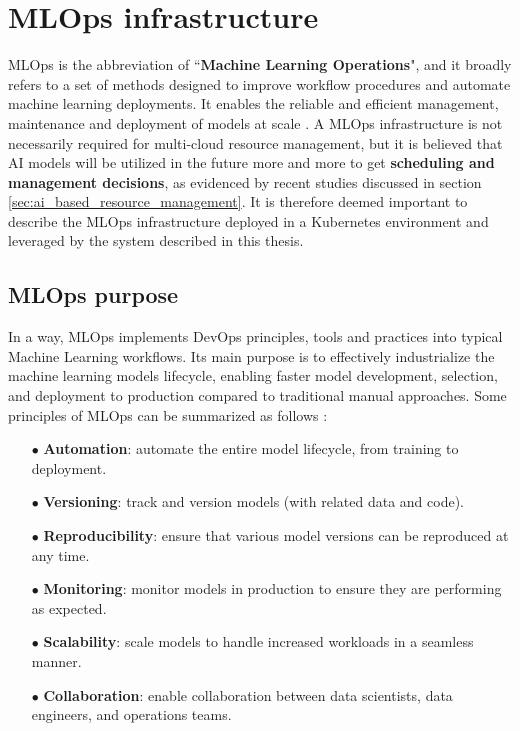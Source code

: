 \section{MLOps infrastructure}
\label{sec:mlops_infrastructure}

MLOps is the abbreviation of ``\textbf{Machine Learning Operations}", and it broadly refers to a set of methods designed to improve workflow procedures and automate machine learning deployments. 
It enables the reliable and efficient management, maintenance and deployment of models at scale \cite{mlops_ubuntu}.
A MLOps infrastructure is not necessarily required for multi-cloud resource management, but it is believed that AI models will be utilized in the future more and more to get \textbf{scheduling and management decisions}, as evidenced by recent studies discussed in section \ref{sec:ai_based_resource_management}.
It is therefore deemed important to describe the MLOps infrastructure deployed in a Kubernetes environment and leveraged by the system described in this thesis.

\subsection{MLOps purpose}

In a way, MLOps implements DevOps principles, tools and practices into typical Machine Learning workflows.
Its main purpose is to effectively industrialize the machine learning models lifecycle, enabling faster model development, selection, and deployment to production compared to traditional manual approaches.
Some principles of MLOps can be summarized as follows \cite{mlops_ubuntu}:
\begin{itemize}[itemsep=0.2pt, topsep=1pt]
  \item[$\bullet$] \textbf{Automation}: automate the entire model lifecycle, from training to deployment.
  \item[$\bullet$] \textbf{Versioning}: track and version models (with related data and code).
  \item[$\bullet$] \textbf{Reproducibility}: ensure that various model versions can be reproduced at any time.
  \item[$\bullet$] \textbf{Monitoring}: monitor models in production to ensure they are performing as expected.
  \item[$\bullet$] \textbf{Scalability}: scale models to handle increased workloads in a seamless manner.
  \item[$\bullet$] \textbf{Collaboration}: enable collaboration between data scientists, data engineers, and operations teams.
\end{itemize}

